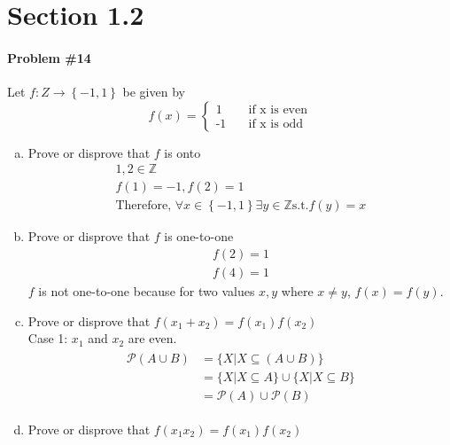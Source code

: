 \documentclass[paper=a4, fontsize=11pt]{scrartcl} %
\numberwithin{equation}{section} %
\numberwithin{figure}{section} %
\numberwithin{table}{section} %
\begin{document}

\section{Section 1.2}

\paragraph{Problem \#14}

Let $f: Z \to \left\{ {-1, 1} \right\}$ be given by
\[  
f(x) =
     \begin{cases}
       \text{1} &\quad\text{if x is even}\\
       \text{-1} &\quad\text{if x is odd}\
     \end{cases}
\]
\begin{enumerate}[a)]
\item Prove or disprove that $f$ is onto
\begin{align}
1, 2 \in \mathbb{Z}\\
f(1) = -1, f(2) = 1\\
\text{Therefore, } \forall x \in \left\{ {-1, 1} \right\} \exists y \in \mathbb{Z} \text{s.t.} f(y) = x                   
\end{align}
\item Prove or disprove that $f$ is one-to-one
\begin{align}
f(2) = 1\\
f(4) = 1
\end{align}
$f$ is not one-to-one because for two values $x,y$ where $x \not= y$, $f(x) = f(y)$.
\item Prove or disprove that $f(x_{1} + x_{2}) = f(x_{1})f(x_{2})$\\
Case 1: $x_{1}$ and $x_{2}$ are even.\\
\begin{align}
\begin{split}
\mathcal P \left({A \cup B}\right)
&= \{X|X \subseteq (A \cup B)\}\\
&=\{X|X \subseteq A\} \cup \{X|X \subseteq B\}\\
&=\mathcal P \left({A}\right) \cup \mathcal P \left({B}\right)
\end{split}                   
\end{align}
\item Prove or disprove that $f(x_{1}x_{2}) = f(x_{1})f(x_{2})$

\end{enumerate}
\end{document}
